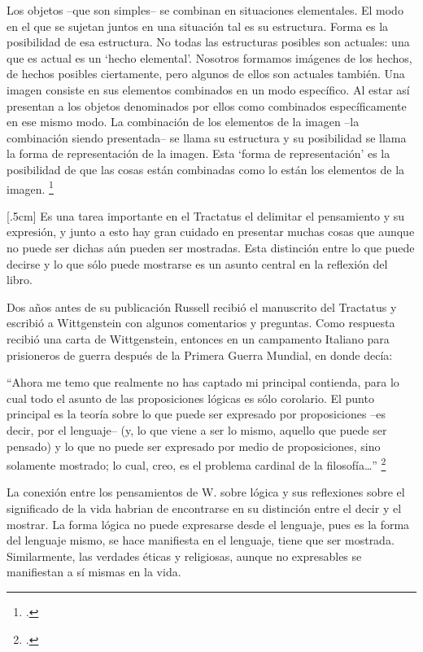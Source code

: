 Los objetos --que son simples-- se combinan en situaciones elementales. El modo en el que se sujetan juntos en una situación tal es su estructura. Forma es la posibilidad de esa estructura. No todas las estructuras posibles son actuales: una que es actual es un `hecho elemental'. Nosotros formamos imágenes de los hechos, de hechos posibles ciertamente, pero algunos de ellos son actuales también. Una imagen consiste en sus elementos combinados en un modo específico. Al estar así presentan a los objetos denominados por ellos como combinados específicamente en ese mismo modo. La combinación de los elementos de la imagen --la combinación siendo presentada-- se llama su estructura y su posibilidad se llama la forma de representación de la imagen. 
Esta `forma de representación' es la posibilidad de que las cosas están combinadas como lo están los elementos de la imagen. \footcite[p. 171]{simplicity}

[.5cm]
Es una tarea importante en el Tractatus el delimitar el pensamiento y su expresión, y junto a esto hay gran cuidado en presentar muchas cosas que aunque no puede ser dichas aún pueden ser mostradas. Esta distinción entre lo que puede decirse y lo que sólo puede mostrarse es un asunto central en la reflexión del libro. 

Dos años antes de su publicación Russell recibió el manuscrito del Tractatus y escribió a Wittgenstein con algunos comentarios y preguntas. Como respuesta recibió una carta de Wittgenstein, entonces en un campamento Italiano para prisioneros de guerra después de la Primera Guerra Mundial, en donde decía:

``Ahora me temo que realmente no has captado mi principal contienda, para lo cual todo el asunto de las proposiciones lógicas es sólo corolario. El punto principal es la teoría sobre lo que puede ser expresado por proposiciones --es decir, por el lenguaje-- (y, lo que viene a ser lo mismo, aquello que puede ser pensado) y lo que no puede ser expresado por medio de proposiciones, sino solamente mostrado; lo cual, creo, es el problema cardinal de la filosofía\ldots'' \footcite[p. 161]{IWT}

La conexión entre los pensamientos de W. sobre lógica y sus reflexiones sobre el significado de la vida habrian de encontrarse en su distinción entre el decir y el mostrar. La forma lógica no puede expresarse desde el lenguaje, pues es la forma del lenguaje mismo, se hace manifiesta en el lenguaje, tiene que ser mostrada. Similarmente, las verdades éticas y religiosas, aunque no expresables se manifiestan a sí mismas en la vida. 

